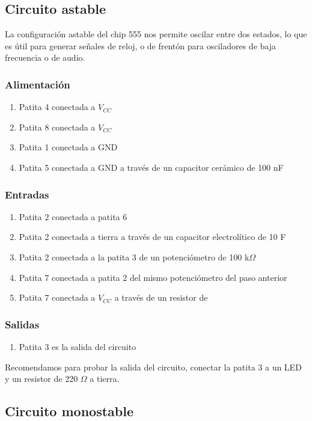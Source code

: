 \documentclass[../principal.tex]{subfiles}
\begin{document}
\subsection{Circuito astable}

La configuración astable del chip 555 nos permite oscilar entre dos estados, lo que es útil para generar señales de reloj, o de frentón para osciladores de baja frecuencia o de audio.

\subsubsection{Alimentación}

\begin{enumerate}
    \item Patita 4 conectada a $V_{CC}$
    \item Patita 8 conectada a $V_{CC}$
    \item Patita 1 conectada a GND
    \item Patita 5 conectada a GND a través de un capacitor cerámico de 100 nF
\end{enumerate}

\subsubsection{Entradas}

\begin{enumerate}
    \item Patita 2 conectada a patita 6
    \item Patita 2 conectada a tierra a través de un capacitor electrolítico de 10 \textmu F
    \item Patita 2 conectada a la patita 3 de un potenciómetro de 100 k$\Omega$
    \item Patita 7 conectada a patita 2 del mismo potenciómetro del paso anterior
    \item Patita 7 conectada a $V_{CC}$ a través de un resistor de 
\end{enumerate}


\subsubsection{Salidas}

\begin{enumerate}
    \item Patita 3 es la salida del circuito
\end{enumerate}

Recomendamos para probar la salida del circuito, conectar la patita 3 a un LED y un resistor de 220 $\Omega$ a tierra.

\subsection{Circuito monostable}



\newpage
\end{document}
